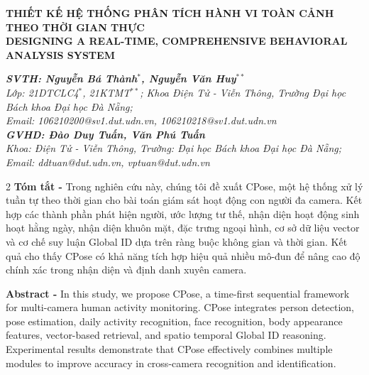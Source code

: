 \documentclass[a4paper, twoside, 12pt]{article}
\begin{document}
\setlength{\multicolsep}{5pt} %

\fontsize{12.5}{15}\selectfont 

\thispagestyle{firstpage} %

\begin{center}
    {\fontsize{12.3}{15}\selectfont \textcolor{myblue}{\textbf{THIẾT KẾ HỆ THỐNG PHÂN TÍCH HÀNH VI TOÀN CẢNH THEO THỜI GIAN THỰC}}} \\
    \vspace{2pt}
    {\fontsize{12.5}{15}\selectfont \textcolor{myred}{\textbf{DESIGNING A REAL-TIME, COMPREHENSIVE BEHAVIORAL ANALYSIS SYSTEM}}} \\
    
    \vspace{10pt}
    
    {\fontsize{11}{13}\selectfont
        \textit{\textbf{SVTH: Nguyễn Bá Thành$^*$, Nguyễn Văn Huy$^{**}$}} \\
        \textit{Lớp: 21DTCLC4$^*$, 21KTMT$^{**}$; Khoa Điện Tử - Viễn Thông, Trường Đại học Bách khoa Đại học Đà Nẵng;} \\
        \textit{Email: 106210200@sv1.dut.udn.vn, 106210218@sv1.dut.udn.vn} \\
        \vspace{5pt}
        \textit{\textbf{GVHD: Đào Duy Tuấn, Văn Phú Tuấn}} \\
        \textit{Khoa: Điện Tử - Viễn Thông, Trường: Đại học Bách khoa Đại học Đà Nẵng;}\\
        \textit{Email: ddtuan@dut.udn.vn, vptuan@dut.udn.vn}
    }
\end{center}

\begin{multicols}{2}
\textbf{Tóm tắt -} Trong nghiên cứu này, chúng tôi đề xuất CPose, một hệ thống xử lý tuần tự theo thời gian cho bài toán giám sát hoạt động con người đa camera. Kết hợp các thành phần phát hiện người, ước lượng tư thế, nhận diện hoạt động sinh hoạt hằng ngày, nhận diện khuôn mặt, đặc trưng ngoại hình, cơ sở dữ liệu vector và cơ chế suy luận Global ID dựa trên ràng buộc không gian và thời gian. Kết quả cho thấy CPose có khả năng tích hợp hiệu quả nhiều mô-đun để nâng cao độ chính xác trong nhận diện và định danh xuyên camera.

\columnbreak

\textbf{Abstract -} In this study, we propose CPose, a time-first sequential framework for multi-camera human activity monitoring. CPose integrates person detection, pose estimation, daily activity recognition, face recognition, body appearance features, vector-based retrieval, and spatio temporal Global ID reasoning. Experimental results demonstrate that CPose effectively combines multiple modules to improve accuracy in cross-camera recognition and identification.

\end{multicols}
\end{document}

